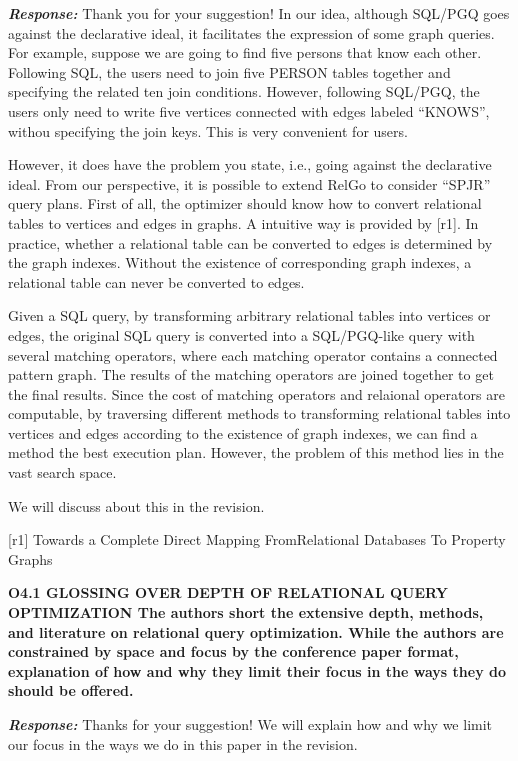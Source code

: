 \textbf{\textit{Response: }}
Thank you for your suggestion! 
In our idea, although SQL/PGQ goes against the declarative ideal, it facilitates the expression of some graph queries.
For example, suppose we are going to find five persons that know each other.
Following SQL, the users need to join five PERSON tables together and specifying the related ten join conditions.
However, following SQL/PGQ, the users only need to write five vertices connected with edges labeled ``KNOWS'', withou specifying the join keys.
This is very convenient for users.

However, it does have the problem you state, i.e., going against the declarative ideal.
From our perspective, it is possible to extend RelGo to consider ``SPJR'' query plans.
First of all, the optimizer should know how to convert relational tables to vertices and edges in graphs.
A intuitive way is provided by [r1].
In practice, whether a relational table can be converted to edges is determined by the graph indexes.
Without the existence of corresponding graph indexes, a relational table can never be converted to edges.

Given a SQL query, by transforming arbitrary relational tables into vertices or edges, the original SQL query is converted into a SQL/PGQ-like query with several matching operators, where each matching operator contains a connected pattern graph.
The results of the matching operators are joined together to get the final results.
Since the cost of matching operators and relaional operators are computable, by traversing different methods to transforming relational tables into vertices and edges according to the existence of graph indexes, we can find a method the best execution plan.
However, the problem of this method lies in the vast search space.

We will discuss about this in the revision.

[r1] Towards a Complete Direct Mapping FromRelational Databases To Property Graphs

\textbf{O4.1 GLOSSING OVER DEPTH OF RELATIONAL QUERY OPTIMIZATION
The authors short the extensive depth, methods, and literature on relational query optimization. While the authors are constrained by space and focus by the conference paper format, explanation of how and why they limit their focus in the ways they do should be offered. }

\textbf{\textit{Response: }}
Thanks for your suggestion! We will explain how and why we limit our focus in the ways we do in this paper in the revision.

